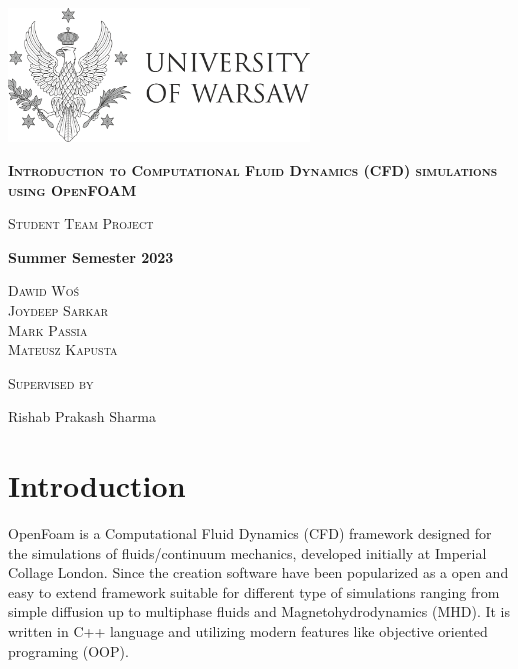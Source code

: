 \documentclass{article}
\begin{document}
\begin{titlepage}
	\centering
	\includegraphics[width=0.6\textwidth]{EN_zwykly.png}\par
	\vspace{2cm}
	{\scshape\LARGE \bfseries  Introduction to Computational Fluid Dynamics (CFD) simulations using OpenFOAM\par}
	\vfill%
	
	{\scshape\Large Student Team Project\par}
	\vfill
	
	{\huge\bfseries  Summer Semester 2023 \par}
	\vfill
	
	{\Large\scshape
 Dawid Woś\\
 Joydeep Sarkar\\
  Mark Passia\\
 Mateusz Kapusta\\}
	\vspace{1.5cm}

	\vfill
	{\Large \scshape Supervised by\par
	Rishab Prakash Sharma}


	\vfill
\end{titlepage}
\tableofcontents

\newpage
\section{Introduction}
OpenFoam is a Computational Fluid Dynamics (CFD) framework designed for the simulations of fluids/continuum mechanics, developed initially at Imperial Collage London. Since the creation 
software have been popularized as a open and easy to extend framework suitable for different type of simulations ranging from simple diffusion up to multiphase fluids and Magnetohydrodynamics 
(MHD). It is written in C++ language and utilizing modern features like objective oriented programing (OOP). 
\end{document}
